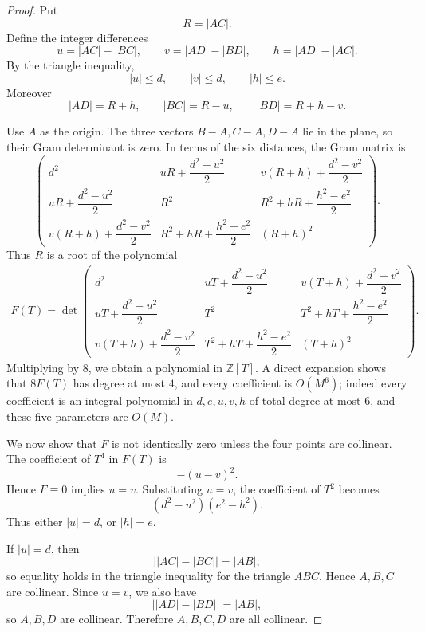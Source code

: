 \documentclass[11pt]{article}
\newcommand{\ZZ}{\mathbb Z}
\begin{document}
\begin{proof}
Put
\[
        R=|AC|.
\]
Define the integer differences
\[
        u=|AC|-|BC|,
        \qquad
        v=|AD|-|BD|,
        \qquad
        h=|AD|-|AC|.
\]
By the triangle inequality,
\[
        |u|\le d,
        \qquad |v|\le d,
        \qquad |h|\le e.
\]
Moreover
\[
        |AD|=R+h,
        \qquad |BC|=R-u,
        \qquad |BD|=R+h-v.
\]

Use \(A\) as the origin.  The three vectors \(B-A,C-A,D-A\) lie in the plane,
so their Gram determinant is zero.  In terms of the six distances, the Gram
matrix is
\[
\begin{pmatrix}
        d^2
        &
        uR+\dfrac{d^2-u^2}{2}
        &
        v(R+h)+\dfrac{d^2-v^2}{2}
        \\[6pt]
        uR+\dfrac{d^2-u^2}{2}
        &
        R^2
        &
        R^2+hR+\dfrac{h^2-e^2}{2}
        \\[6pt]
        v(R+h)+\dfrac{d^2-v^2}{2}
        &
        R^2+hR+\dfrac{h^2-e^2}{2}
        &
        (R+h)^2
\end{pmatrix}.
\]
Thus \(R\) is a root of the polynomial
\[
\begin{aligned}
        F(T)=\det
\begin{pmatrix}
        d^2
        &
        uT+\dfrac{d^2-u^2}{2}
        &
        v(T+h)+\dfrac{d^2-v^2}{2}
        \\[6pt]
        uT+\dfrac{d^2-u^2}{2}
        &
        T^2
        &
        T^2+hT+\dfrac{h^2-e^2}{2}
        \\[6pt]
        v(T+h)+\dfrac{d^2-v^2}{2}
        &
        T^2+hT+\dfrac{h^2-e^2}{2}
        &
        (T+h)^2
\end{pmatrix}.
\end{aligned}
\]
Multiplying by \(8\), we obtain a polynomial in \(\ZZ[T]\).  A direct
expansion shows that \(8F(T)\) has degree at most \(4\), and every coefficient
is \(O(M^6)\); indeed every coefficient is an integral polynomial in
\(d,e,u,v,h\) of total degree at most \(6\), and these five parameters are
\(O(M)\).

We now show that \(F\) is not identically zero unless the four points are
collinear.  The coefficient of \(T^4\) in \(F(T)\) is
\[
        -(u-v)^2.
\]
Hence \(F\equiv0\) implies \(u=v\).  Substituting \(u=v\), the coefficient of
\(T^2\) becomes
\[
        (d^2-u^2)(e^2-h^2).
\]
Thus either \(|u|=d\), or \(|h|=e\).

If \(|u|=d\), then
\[
        \bigl||AC|-|BC|\bigr|=|AB|,
\]
so equality holds in the triangle inequality for the triangle \(ABC\).  Hence
\(A,B,C\) are collinear.  Since \(u=v\), we also have
\[
        \bigl||AD|-|BD|\bigr|=|AB|,
\]
so \(A,B,D\) are collinear.  Therefore \(A,B,C,D\) are all collinear.


\end{proof}
\end{document}
